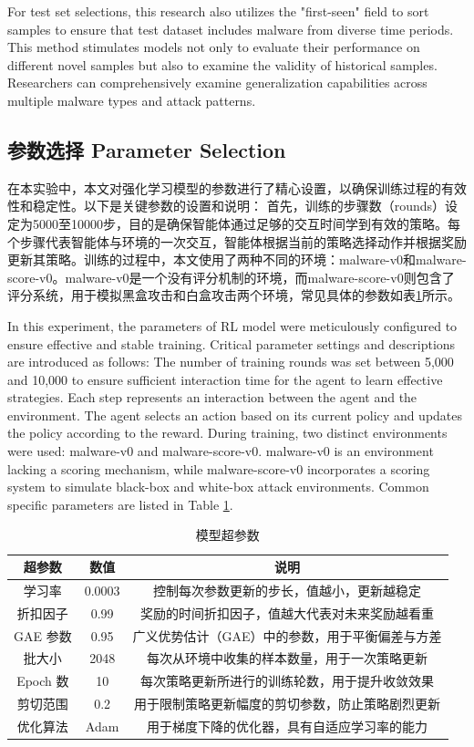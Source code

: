 For test set selections, this research also utilizes the "first-seen" field to sort samples to ensure that test dataset includes malware from diverse time periods. This method stimulates models not only to evaluate their performance on different novel samples but also to examine the validity of historical samples. Researchers can comprehensively examine generalization capabilities across multiple malware types and attack patterns.

\subsection{参数选择 Parameter Selection}

在本实验中，本文对强化学习模型的参数进行了精心设置，以确保训练过程的有效性和稳定性。以下是关键参数的设置和说明：
首先，训练的步骤数（rounds）设定为5000至10000步，目的是确保智能体通过足够的交互时间学到有效的策略。每个步骤代表智能体与环境的一次交互，智能体根据当前的策略选择动作并根据奖励更新其策略。训练的过程中，本文使用了两种不同的环境：malware-v0和malware-score-v0。malware-v0是一个没有评分机制的环境，而malware-score-v0则包含了评分系统，用于模拟黑盒攻击和白盒攻击两个环境，常见具体的参数如表\ref{tab:5.5}所示。

In this experiment, the parameters of RL model were meticulously configured to ensure effective and stable training. Critical parameter settings and descriptions are introduced as follows: The number of training rounds was set between 5,000 and 10,000 to ensure sufficient interaction time for the agent to learn effective strategies. Each step represents an interaction between the agent and the environment. The agent selects an action based on its current policy and updates the policy according to the reward. During training, two distinct environments were used: malware-v0 and malware-score-v0. malware-v0 is an environment lacking a scoring mechanism, while malware-score-v0 incorporates a scoring system to simulate black-box and white-box attack environments. Common specific parameters are listed in Table \ref{tab:5.5}.

\begin{table}[htbp]
	\centering
	\caption{模型超参数}
	\label{tab:5.5}
    \begin{tabular*}{0.9\textwidth}{@{\extracolsep{\fill}}ccc}
    \toprule
		超参数 & 数值 & 说明 \\
    \midrule
		学习率 & 0.0003 & 控制每次参数更新的步长，值越小，更新越稳定 \\
		折扣因子 & 0.99 & 奖励的时间折扣因子，值越大代表对未来奖励越看重 \\
		GAE 参数 & 0.95 & 广义优势估计（GAE）中的参数，用于平衡偏差与方差 \\
		批大小 & 2048 & 每次从环境中收集的样本数量，用于一次策略更新 \\
		Epoch 数 & 10 & 每次策略更新所进行的训练轮数，用于提升收敛效果 \\
		剪切范围 & 0.2 & 用于限制策略更新幅度的剪切参数，防止策略剧烈更新\\
		优化算法 & Adam & 用于梯度下降的优化器，具有自适应学习率的能力 \\
    \bottomrule
	\end{tabular*}
\end{table}

